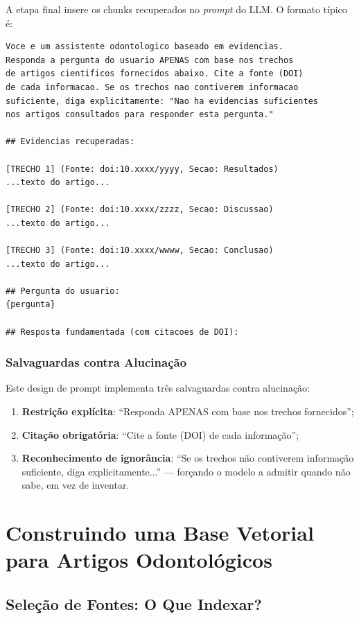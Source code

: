 A etapa final insere os chunks recuperados no \textit{prompt} do LLM. O formato típico é:

\begin{lstlisting}[language={}, caption={Template de prompt para RAG odontológico}]
Voce e um assistente odontologico baseado em evidencias.
Responda a pergunta do usuario APENAS com base nos trechos
de artigos cientificos fornecidos abaixo. Cite a fonte (DOI)
de cada informacao. Se os trechos nao contiverem informacao
suficiente, diga explicitamente: "Nao ha evidencias suficientes
nos artigos consultados para responder esta pergunta."

## Evidencias recuperadas:

[TRECHO 1] (Fonte: doi:10.xxxx/yyyy, Secao: Resultados)
...texto do artigo...

[TRECHO 2] (Fonte: doi:10.xxxx/zzzz, Secao: Discussao)
...texto do artigo...

[TRECHO 3] (Fonte: doi:10.xxxx/wwww, Secao: Conclusao)
...texto do artigo...

## Pergunta do usuario:
{pergunta}

## Resposta fundamentada (com citacoes de DOI):
\end{lstlisting}

\subsubsection{Salvaguardas contra Alucinação}

Este design de prompt implementa três salvaguardas contra alucinação:
\begin{enumerate}
    \item \textbf{Restrição explícita}: ``Responda APENAS com base nos trechos fornecidos'';
    \item \textbf{Citação obrigatória}: ``Cite a fonte (DOI) de cada informação'';
    \item \textbf{Reconhecimento de ignorância}: ``Se os trechos não contiverem informação suficiente, diga explicitamente...'' --- forçando o modelo a admitir quando não sabe, em vez de inventar.
\end{enumerate}

\section{Construindo uma Base Vetorial para Artigos Odontológicos}

\subsection{Seleção de Fontes: O Que Indexar?}

